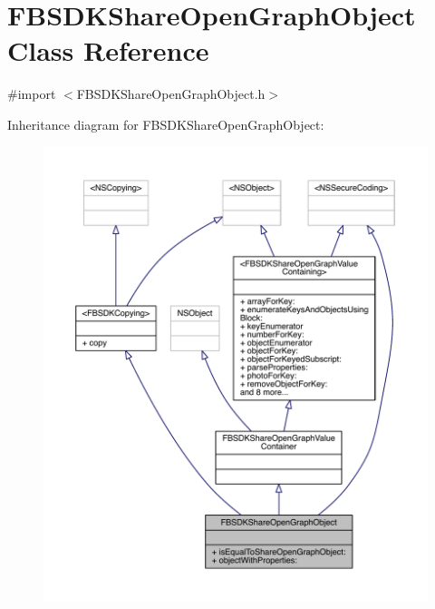 \hypertarget{interface_f_b_s_d_k_share_open_graph_object}{\section{F\-B\-S\-D\-K\-Share\-Open\-Graph\-Object Class Reference}
\label{interface_f_b_s_d_k_share_open_graph_object}
}


{\ttfamily \#import $<$F\-B\-S\-D\-K\-Share\-Open\-Graph\-Object.\-h$>$}



Inheritance diagram for F\-B\-S\-D\-K\-Share\-Open\-Graph\-Object\-:
\nopagebreak
\begin{figure}[H]
\begin{center}
\leavevmode
\includegraphics[width=350pt]{interface_f_b_s_d_k_share_open_graph_object__inherit__graph}
\end{center}
\end{figure}


